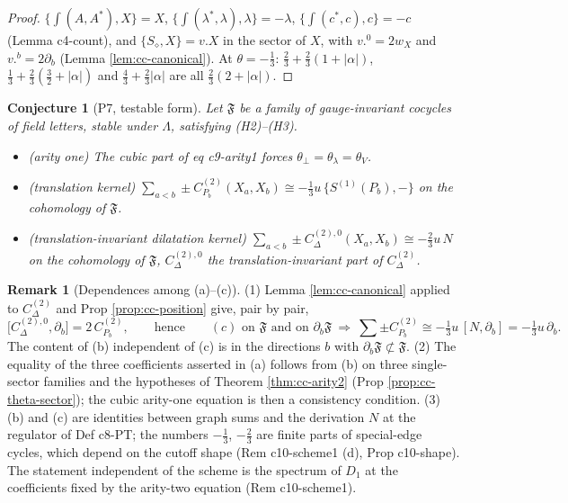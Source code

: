 \documentclass[11pt]{article}
\numberwithin{equation}{section}
\theoremstyle{plain}
\newtheorem{conjecture}[theorem]{Conjecture}
\theoremstyle{definition}
\newtheorem{remark}[theorem]{Remark}
\begin{document}
\begin{proof}
$\{\int(A,A^*),X\}=X$, $\{\int(\lambda^*,\lambda),\lambda\}=-\lambda$, $\{\int(c^*,c),c\}=-c$ (Lemma c4-count), and $\{S_\diamond,X\}=v.X$ in the sector of $X$, with $v.^0=2w_X$ and $v.^b=2\partial_b$ (Lemma \ref{lem:cc-canonical}). At $\theta=-\tfrac13$: $\tfrac23+\tfrac23(1+|\alpha|)$, $\tfrac13+\tfrac23(\tfrac32+|\alpha|)$ and $\tfrac43+\tfrac23|\alpha|$ are all $\tfrac23(2+|\alpha|)$.
\end{proof}

\begin{conjecture}[P7, testable form]
\label{conj:cc-P7}
Let $\mathfrak F$ be a family of gauge-invariant cocycles of field letters, stable under $\Lambda$, satisfying (H2)--(H3).
\begin{itemize}
\item[(a)] (arity one) The cubic part of eq c9-arity1 forces $\theta_\perp=\theta_\lambda=\theta_V$.
\item[(b)] (translation kernel) $\sum_{a<b}\pm C^{(2)}_{P_b}(X_a,X_b)\cong-\tfrac13u\,\{S^{(1)}(P_b),-\}$ on the cohomology of $\mathfrak F$.
\item[(c)] (translation-invariant dilatation kernel) $\sum_{a<b}\pm C^{(2),0}_\Delta(X_a,X_b)\cong-\tfrac23u\,N$ on the cohomology of $\mathfrak F$, $C^{(2),0}_\Delta$ the translation-invariant part of $C^{(2)}_\Delta$.
\end{itemize}
\end{conjecture}

\begin{remark}[Dependences among (a)--(c)]
\label{rem:cc-P7dep}
(1) Lemma \ref{lem:cc-canonical} applied to $C^{(2)}_\Delta$ and Prop \ref{prop:cc-position} give, pair by pair,
\[
\big[C^{(2),0}_\Delta,\partial_b\big]=2\,C^{(2)}_{P_b},\qquad\text{hence}\qquad (c)\text{ on }\mathfrak F\text{ and on }\partial_b\mathfrak F\ \Longrightarrow\ \sum\pm C^{(2)}_{P_b}\cong-\tfrac13u\,[N,\partial_b]=-\tfrac13u\,\partial_b .
\]
The content of (b) independent of (c) is in the directions $b$ with $\partial_b\mathfrak F\not\subset\mathfrak F$. (2) The equality of the three coefficients asserted in (a) follows from (b) on three single-sector families and the hypotheses of Theorem \ref{thm:cc-arity2} (Prop \ref{prop:cc-theta-sector}); the cubic arity-one equation is then a consistency condition. (3) (b) and (c) are identities between graph sums and the derivation $N$ at the regulator of Def c8-PT; the numbers $-\tfrac13$, $-\tfrac23$ are finite parts of special-edge cycles, which depend on the cutoff shape (Rem c10-scheme1 (d), Prop c10-shape). The statement independent of the scheme is the spectrum of $D_1$ at the coefficients fixed by the arity-two equation (Rem c10-scheme1).
\end{remark}
\end{document}
